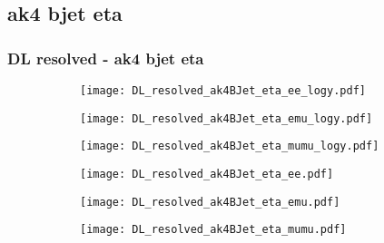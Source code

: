 \documentclass[aspectratio=169,8pt]{beamer}
\begin{document}
\subsection{ak4 bjet eta}
\begin{frame}
\frametitle{DL resolved - ak4 bjet eta}
\begin{figure}
\captionsetup[subfigure]{labelformat=empty}
\begin{subfigure}{0.32\textwidth}
\texttt{[image: DL\_resolved\_ak4BJet\_eta\_ee\_logy.pdf]}
\vspace*{-0.15cm}
\end{subfigure}
\hfil
\begin{subfigure}{0.32\textwidth}
\texttt{[image: DL\_resolved\_ak4BJet\_eta\_emu\_logy.pdf]}
\vspace*{-0.15cm}
\end{subfigure}
\hfil
\begin{subfigure}{0.32\textwidth}
\texttt{[image: DL\_resolved\_ak4BJet\_eta\_mumu\_logy.pdf]}
\vspace*{-0.15cm}
\end{subfigure}
\hfil
\begin{subfigure}{0.32\textwidth}
\texttt{[image: DL\_resolved\_ak4BJet\_eta\_ee.pdf]}
\vspace*{-0.15cm}
\end{subfigure}
\hfil
\begin{subfigure}{0.32\textwidth}
\texttt{[image: DL\_resolved\_ak4BJet\_eta\_emu.pdf]}
\vspace*{-0.15cm}
\end{subfigure}
\hfil
\begin{subfigure}{0.32\textwidth}
\texttt{[image: DL\_resolved\_ak4BJet\_eta\_mumu.pdf]}
\vspace*{-0.15cm}
\end{subfigure}
\hfil
\end{figure}
\end{frame}
\newpage
\end{document}
